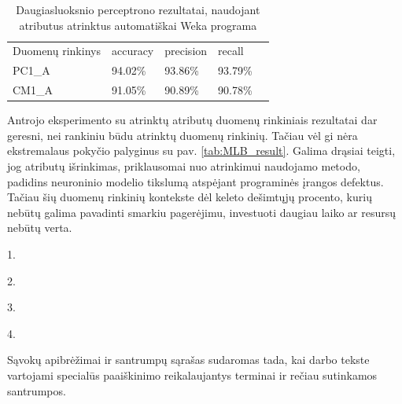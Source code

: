 \documentclass{VUMIFPSbakalaurinis}
\begin{document}
\begin{table}[H]\footnotesize
\centering
\caption{Daugiasluoksnio perceptrono rezultatai, naudojant atributus atrinktus automatiškai Weka programa}
\label{tab:MLP_result_2}
\begin{tabular}{lllll}
\cline{1-4}
\multicolumn{1}{|l}{Duomenų rinkinys} & accuracy & precision & \multicolumn{1}{l|}{recall} &  \\ \cline{1-4}
\multicolumn{1}{|l}{PC1\_A}              & 94.02\%   & 93.86\%     & \multicolumn{1}{l|}{93.79\%} &  \\
\multicolumn{1}{|l}{CM1\_A}              & 91.05\%    & 90.89\%     & \multicolumn{1}{l|}{90.78\%}  &  \\ \cline{1-4}
\end{tabular}
\end{table}

Antrojo eksperimento su atrinktų atributų duomenų rinkiniais rezultatai dar geresni, nei rankiniu būdu atrinktų duomenų rinkinių. Tačiau vėl gi nėra ekstremalaus pokyčio palyginus su pav. \ref{tab:MLB_result}. Galima drąsiai teigti, jog atributų išrinkimas, priklausomai nuo atrinkimui naudojamo metodo, padidins neuroninio modelio tikslumą atspėjant programinės įrangos defektus. Tačiau šių duomenų rinkinių kontekste dėl keleto dešimtųjų procento, kurių nebūtų galima pavadinti smarkiu pagerėjimu, investuoti daugiau laiko ar resursų nebūtų verta.



1.

2.

3.

4.



\printbibliography[heading=bibintoc]  %

Sąvokų apibrėžimai ir santrumpų sąrašas sudaromas tada, kai darbo tekste
vartojami specialūs paaiškinimo reikalaujantys terminai ir rečiau sutinkamos
santrumpos.
\end{document}
